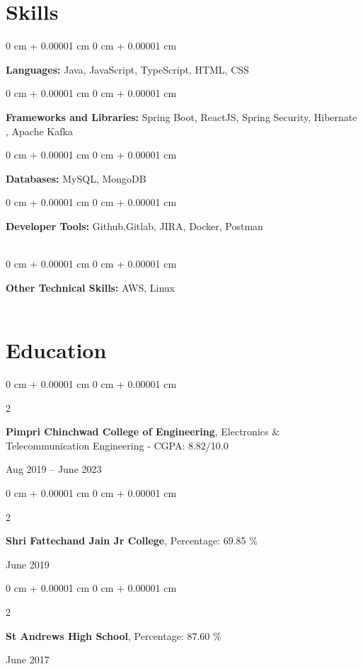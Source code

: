 \documentclass[10pt, letterpaper]{article}
\newenvironment{onecolentry}{
    \begin{adjustwidth}{
        0 cm + 0.00001 cm
    }{
        0 cm + 0.00001 cm
    }
}{
    \end{adjustwidth}
} %
\newenvironment{twocolentry}[2][]{
    \onecolentry
    \def\secondColumn{#2}
    \setcolumnwidth{\fill, 4.5 cm}
    \begin{paracol}{2}
}{
    \switchcolumn \raggedleft \secondColumn
    \end{paracol}
    \endonecolentry
} %
\begin{document}
\section{Skills}
        
        \begin{onecolentry}
            \textbf{Languages:} Java, JavaScript, TypeScript, HTML, CSS \textcolor{white}{Python}
        \end{onecolentry}


        \vspace{0.1 cm}

        \begin{onecolentry}
            \textbf{Frameworks and Libraries:} Spring Boot, ReactJS, Spring Security, Hibernate , Apache Kafka \textcolor{white}{Microservices}
        \end{onecolentry}
        
        \vspace{0.1 cm}

        \begin{onecolentry}
            \textbf{Databases:} MySQL, MongoDB \end{onecolentry}

        \vspace{0.1 cm}

        \begin{onecolentry}
            \textbf{Developer Tools:} Github,Gitlab, JIRA, Docker, Postman \textcolor{white}{Jenkins, Maven, Kubernates} \textcolor{white}{AWS EC2} \textcolor{white}{AWS S3} 
        \end{onecolentry}

        \vspace{0.1 cm}

        \begin{onecolentry}
            \textbf{Other Technical Skills:} AWS, Linux \textcolor{white}{Data Structure and Algorithms, Computer Network, Operating System}
        \end{onecolentry}

        \vspace{0.1 cm}

        \section{Education}
        
        \begin{twocolentry}{
            Aug 2019 – June 2023
        }
            \textbf{Pimpri Chinchwad College of Engineering}, Electronics \& Telecommunication Engineering -  CGPA: 8.82/10.0 
        \end{twocolentry}
        \begin{twocolentry}{
            June 2019 
        }
            \textbf{Shri Fattechand Jain Jr College},  Percentage: 69.85 \%
        \end{twocolentry}
        \begin{twocolentry}{
            June 2017 
        }
            \textbf{St Andrews High School},  Percentage: 87.60 \%
        \end{twocolentry}
\end{document}
